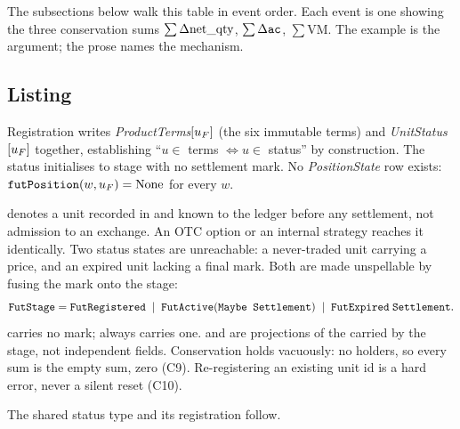 \noindent The subsections below walk this table in event order. Each event is one 
showing the three conservation sums $\sum\Delta\mathrm{net\_qty}$, $\sum\Delta\texttt{ac}$, $\sum\mathrm{VM}$. The example
is the argument; the prose names the mechanism.

\subsection{Listing}

Registration writes \emph{ProductTerms}$[u_{F}]$ (the six immutable terms) and
\emph{UnitStatus}$[u_{F}]$ together, establishing ``$u\in$ terms $\iff u\in$ status'' by construction.
The status initialises to stage  with no settlement mark. No \emph{PositionState} row
exists: $\texttt{futPosition}(w,u_{F})=\mathrm{None}$ for every $w$.

 denotes a unit recorded in and known to the ledger before any settlement, not
admission to an exchange. An OTC option or an internal strategy reaches it identically. Two status
states are unreachable: a never-traded unit carrying a price, and an expired unit lacking a final
mark. Both are made unspellable by fusing the mark onto the stage:
\[
\texttt{FutStage}=\texttt{FutRegistered}\;\mid\;\texttt{FutActive}(\texttt{Maybe Settlement})\;\mid\;
\texttt{FutExpired}\;\texttt{Settlement}.
\]
 carries no mark;  always carries one. 
and  are projections of the  carried by the stage, not
independent fields. Conservation holds vacuously: no holders, so every sum is the empty sum, zero
(C9). Re-registering an existing unit id is a hard error, never a silent reset (C10).

The shared status type and its registration follow.

